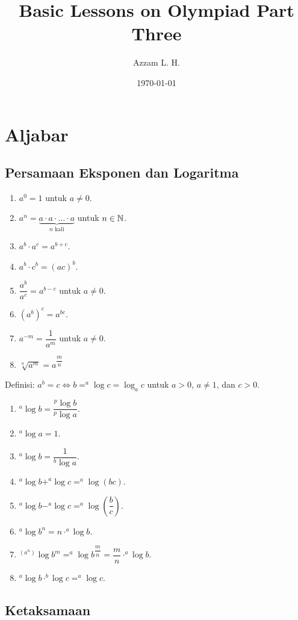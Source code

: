 \documentclass[11pt]{scrartcl}
\begin{document}
	\title{Basic Lessons on Olympiad Part Three} %
	\date{\today}
	\author{Azzam L. H.}
	\maketitle
    
    \section{Aljabar}
    \subsection{Persamaan Eksponen dan Logaritma}
    \begin{enumerate}
        \item $a^0=1$ untuk $a \neq 0$.
        \item $a^n =  \underbrace{a \cdot a \cdot \ldots \cdot a}_{n \text{ kali}}$ untuk $n \in \mathbb N$.
        \item $a^b\cdot a^c=a^{b+c}$.
        \item $a^b\cdot c^b = (ac)^b$.
        \item $\dfrac{a^b}{a^c}=a^{b-c}$ untuk $a\neq 0$.
        \item $(a^b)^c=a^{bc}$.
        \item $a^{-m} = \dfrac{1}{a^m}$ untuk $a \neq 0$.
        \item $\sqrt[n]{a^m}=a^{\dfrac{m}{n}}$
    \end{enumerate}
    
    Definisi: $a^b =c \iff b = ^a \log c = \log_a c$ untuk $a> 0$, $a \neq 1$, dan $c >0$.
    \begin{enumerate}
        \item $^a \log b = \dfrac{^p \log b}{^p \log a}$.
        \item $^a \log a = 1$.
        \item $^a \log b = \dfrac{1}{^b \log a}$.
        \item $^a \log b + ^a \log c = ^a \log (bc)$.
        \item $^a \log b - ^a \log c = ^a \log \left(\dfrac{b}{c}\right)$.
        \item $^a \log b^n = n \cdot ^a \log b$.
        \item $^(a^n) \log b^m = ^a \log b^{\dfrac{m}{n}} = \dfrac{m}{n}\cdot ^a \log b$.
        \item $^a \log b \cdot ^b\log c = ^a \log c$.
    \end{enumerate}
    \subsection{Ketaksamaan}
\end{document}
